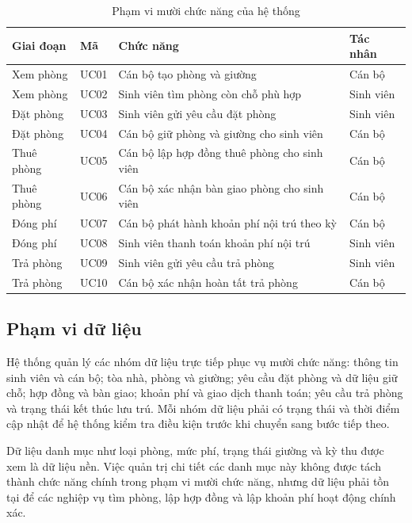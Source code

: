 \begin{table}[H]
\centering
\small
\caption{Phạm vi mười chức năng của hệ thống}
\label{tab:ch1-2}
\begin{tabularx}{\textwidth}{|>{\raggedright\arraybackslash}p{}|>{\raggedright\arraybackslash}X|>{\raggedright\arraybackslash}p{}|>{\raggedright\arraybackslash}p{}|}
\hline
\textbf{Giai đoạn} & \textbf{Mã} & \textbf{Chức năng} & \textbf{Tác nhân} \\
\hline
Xem phòng & UC01 & Cán bộ tạo phòng và giường & Cán bộ \\
\hline
Xem phòng & UC02 & Sinh viên tìm phòng còn chỗ phù hợp & Sinh viên \\
\hline
Đặt phòng & UC03 & Sinh viên gửi yêu cầu đặt phòng & Sinh viên \\
\hline
Đặt phòng & UC04 & Cán bộ giữ phòng và giường cho sinh viên & Cán bộ \\
\hline
Thuê phòng & UC05 & Cán bộ lập hợp đồng thuê phòng cho sinh viên & Cán bộ \\
\hline
Thuê phòng & UC06 & Cán bộ xác nhận bàn giao phòng cho sinh viên & Cán bộ \\
\hline
Đóng phí & UC07 & Cán bộ phát hành khoản phí nội trú theo kỳ & Cán bộ \\
\hline
Đóng phí & UC08 & Sinh viên thanh toán khoản phí nội trú & Sinh viên \\
\hline
Trả phòng & UC09 & Sinh viên gửi yêu cầu trả phòng & Sinh viên \\
\hline
Trả phòng & UC10 & Cán bộ xác nhận hoàn tất trả phòng & Cán bộ \\
\hline
\end{tabularx}
\end{table}

\subsection{Phạm vi dữ liệu}

Hệ thống quản lý các nhóm dữ liệu trực tiếp phục vụ mười chức năng: thông tin sinh viên và cán bộ; tòa nhà, phòng và giường; yêu cầu đặt phòng và dữ liệu giữ chỗ; hợp đồng và bàn giao; khoản phí và giao dịch thanh toán; yêu cầu trả phòng và trạng thái kết thúc lưu trú. Mỗi nhóm dữ liệu phải có trạng thái và thời điểm cập nhật để hệ thống kiểm tra điều kiện trước khi chuyển sang bước tiếp theo.

Dữ liệu danh mục như loại phòng, mức phí, trạng thái giường và kỳ thu được xem là dữ liệu nền. Việc quản trị chi tiết các danh mục này không được tách thành chức năng chính trong phạm vi mười chức năng, nhưng dữ liệu phải tồn tại để các nghiệp vụ tìm phòng, lập hợp đồng và lập khoản phí hoạt động chính xác.

